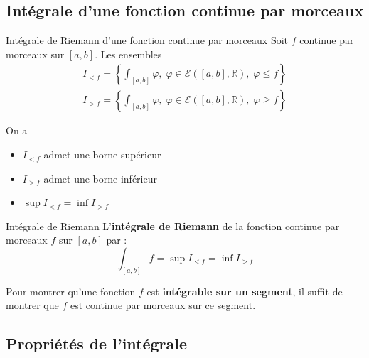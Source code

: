 \subsection{Intégrale d'une fonction continue par morceaux} %
\label{sub:Intégrale d'une fonction continue par morceaux}

\begin{Prop}{Intégrale de Riemann d'une fonction continue par morceaux}{}
  Soit $f$ continue par morceaux sur $[a,b]$. Les ensembles 
\begin{gather}
  I _{<f} = \left\{ \int _{[a,b]} \varphi,\; \varphi \in \mathcal{E}([a,b],\mathbb{R}), \; \varphi \le f\right\} \\
  I _{>f} = \left\{ \int _{[a,b]} \varphi,\; \varphi \in \mathcal{E}([a,b],\mathbb{R}), \; \varphi \ge f\right\}
\end{gather}

On a 
\begin{itemize}

    \item $I _{<f}$ admet une borne supérieur
    \item $I _{>f}$ admet une borne inférieur
    \item $\sup I _{<f} = \inf I _{>f}$
    

\end{itemize}


\end{Prop}

\begin{Definition}[colbacktitle=red!75!black]{Intégrale de Riemann}{}
  L'\textbf{intégrale de Riemann} de la fonction continue par morceaux $f$ sur $[a,b]$ par : 
  \begin{equation}
    \int _{[a,b]} f = \sup I _{<f} = \inf I _{>f}
  \end{equation}

\end{Definition}


\begin{note}{}{}
Pour montrer qu'une fonction $f$ est \textbf{intégrable sur un segment}, il suffit de montrer que $f$ est \underline{continue par morceaux sur ce segment}.
\end{note}

\subsection{Propriétés de l'intégrale} %
\label{sub:Propriétés de l'intégrale}


